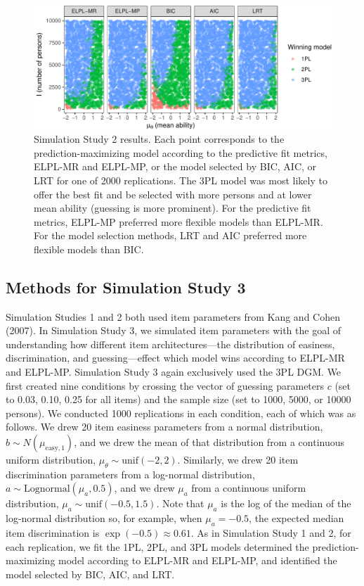 \documentclass[
  english,
  man,floatsintext]{apa7}
\begin{document}
\begin{figure}

{\centering \includegraphics[width=2100px]{irt-predictive-fit-apa_files/figure-latex/results4b-1}

}

\caption{Simulation Study 2 results. Each point corresponds to the prediction-maximizing model according to the predictive fit metrics, ELPL-MR and ELPL-MP, or the model selected by BIC, AIC, or LRT for one of 2000 replications. The 3PL model was most likely to offer the best fit and be selected with more persons and at lower mean ability (guessing is more prominent). For the predictive fit metrics, ELPL-MP preferred more flexible models than ELPL-MR. For the model selection methods, LRT and AIC preferred more flexible models than BIC.}\label{fig:results4b}
\end{figure}

\hypertarget{methods-for-simulation-study-3}{%
\subsection{Methods for Simulation Study 3}\label{methods-for-simulation-study-3}}

Simulation Studies 1 and 2 both used item parameters from Kang and Cohen (2007). In Simulation Study 3, we simulated item parameters with the goal of understanding how different item architectures---the distribution of easiness, discrimination, and guessing---effect which model wins according to ELPL-MR and ELPL-MP. Simulation Study 3 again exclusively used the 3PL DGM. We first created nine conditions by crossing the vector of guessing parameters \(c\) (set to 0.03, 0.10, 0.25 for all items) and the sample size (set to 1000, 5000, or 10000 persons). We conducted 1000 replications in each condition, each of which was as follows. We drew 20 item easiness parameters from a normal distribution, \(b \sim N(\mu_{\text{easy}, 1})\), and we drew the mean of that distribution from a continuous uniform distribution, \(\mu_{\theta} \sim \text{unif}(-2, 2)\). Similarly, we drew 20 item discrimination parameters from a log-normal distribution, \(a \sim \text{Lognormal}(\mu_{a}, 0.5)\), and we drew \(\mu_{a}\) from a continuous uniform distribution, \(\mu_{a} \sim \text{unif}(-0.5, 1.5)\). Note that \(\mu_{a}\) is the log of the median of the log-normal distribution so, for example, when \(\mu_{a} = -0.5\), the expected median item discrimination is \(\exp(-0.5) \approx 0.61\). As in Simulation Study 1 and 2, for each replication, we fit the 1PL, 2PL, and 3PL models determined the prediction-maximizing model according to ELPL-MR and ELPL-MP, and identified the model selected by BIC, AIC, and LRT.
\end{document}
